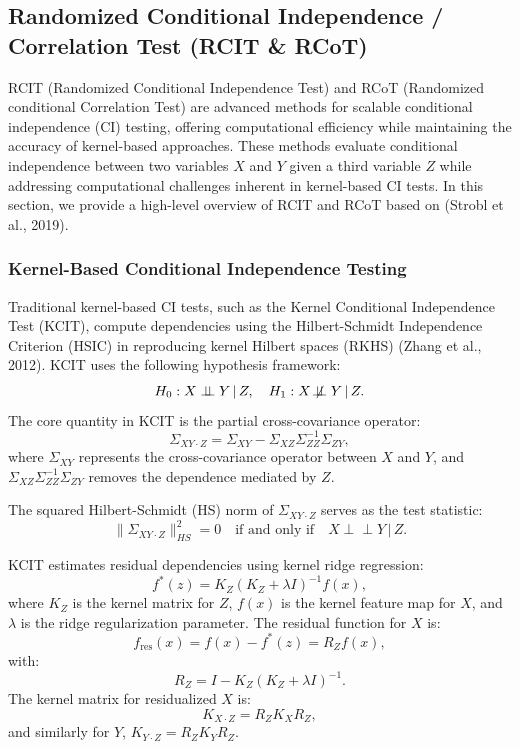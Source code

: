 \documentclass[
]{article}
\begin{document}
\clearpage

\subsection{Randomized Conditional Independence / Correlation Test (RCIT
\& RCoT)}\label{sec-rcot}

RCIT (Randomized Conditional Independence Test) and RCoT (Randomized
conditional Correlation Test) are advanced methods for scalable
conditional independence (CI) testing, offering computational efficiency
while maintaining the accuracy of kernel-based approaches. These methods
evaluate conditional independence between two variables \(X\) and \(Y\)
given a third variable \(Z\) while addressing computational challenges
inherent in kernel-based CI tests. In this section, we provide a
high-level overview of RCIT and RCoT based on (Strobl et al., 2019).

\subsubsection{Kernel-Based Conditional Independence
Testing}\label{kernel-based-conditional-independence-testing}

Traditional kernel-based CI tests, such as the Kernel Conditional
Independence Test (KCIT), compute dependencies using the Hilbert-Schmidt
Independence Criterion (HSIC) in reproducing kernel Hilbert spaces
(RKHS) (Zhang et al., 2012). KCIT uses the following hypothesis
framework: \[
H_0: X \perp\!\!\!\perp Y \,|\, Z, \quad H_1: X \not\!\perp\!\!\!\perp Y \,|\, Z.
\] The core quantity in KCIT is the partial cross-covariance operator:
\[
\Sigma_{XY \cdot Z} = \Sigma_{XY} - \Sigma_{XZ} \Sigma_{ZZ}^{-1} \Sigma_{ZY},
\] where \(\Sigma_{XY}\) represents the cross-covariance operator
between \(X\) and \(Y\), and
\(\Sigma_{XZ} \Sigma_{ZZ}^{-1} \Sigma_{ZY}\) removes the dependence
mediated by \(Z\).

The squared Hilbert-Schmidt (HS) norm of \(\Sigma_{XY \cdot Z}\) serves
as the test statistic: \[
\|\Sigma_{XY \cdot Z}\|^2_{HS} = 0 \quad \text{if and only if} \quad X \perp\!\!\!\perp Y \,|\, Z.
\]

KCIT estimates residual dependencies using kernel ridge regression: \[
f^*(z) = K_Z (K_Z + \lambda I)^{-1} f(x),
\] where \(K_Z\) is the kernel matrix for \(Z\), \(f(x)\) is the kernel
feature map for \(X\), and \(\lambda\) is the ridge regularization
parameter. The residual function for \(X\) is: \[
f_\text{res}(x) = f(x) - f^*(z) = R_Z f(x),
\] with: \[
R_Z = I - K_Z (K_Z + \lambda I)^{-1}.
\] The kernel matrix for residualized \(X\) is: \[
K_{X \cdot Z} = R_Z K_X R_Z,
\] and similarly for \(Y\), \(K_{Y \cdot Z} = R_Z K_Y R_Z\).
\end{document}
